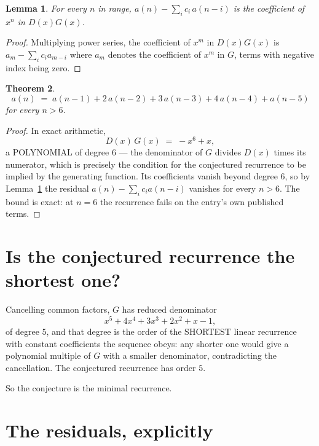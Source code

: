 \documentclass[11pt,a4paper]{article}
\theoremstyle{plain}
\newtheorem{theorem}{Theorem}
\newtheorem{lemma}[theorem]{Lemma}
\theoremstyle{definition}
\begin{document}
\begin{lemma}\label{lem:key}
For every $n$ in range, $a(n)-\sum_i c_i\,a(n-i)$ is the coefficient of $x^{n}$ in
$D(x)G(x)$.
\end{lemma}

\begin{proof}
Multiplying power series, the coefficient of $x^{m}$ in $D(x)G(x)$ is
$a_m-\sum_i c_i a_{m-i}$ where $a_m$ denotes the coefficient of $x^{m}$ in $G$, terms with
negative index being zero.
\end{proof}

\begin{theorem}
\[
a(n)\;=\;a(n-1) + 2\,a(n-2) + 3\,a(n-3) + 4\,a(n-4) + a(n-5)
\]
for every $n>6$.
\end{theorem}

\begin{proof}
In exact arithmetic,
\[
D(x)\,G(x)\;=\;- x^{6} + x,
\]
a POLYNOMIAL of degree $6$ --- the denominator of $G$ divides $D(x)$ times its numerator,
which is precisely the condition for the conjectured recurrence to be implied by the
generating function. Its coefficients vanish beyond degree $6$, so by
Lemma~\ref{lem:key} the residual $a(n)-\sum_ic_ia(n-i)$ vanishes for every
$n>6$. The bound is exact: at $n=6$ the recurrence fails on the entry's own published terms.
\end{proof}

\section{Is the conjectured recurrence the shortest one?}

Cancelling common factors, $G$ has reduced denominator
\[
x^{5} + 4 x^{4} + 3 x^{3} + 2 x^{2} + x - 1,
\]
of degree $5$, and that degree is the order of the SHORTEST linear recurrence with
constant coefficients the sequence obeys: any shorter one would give a polynomial multiple of
$G$ with a smaller denominator, contradicting the cancellation. The conjectured recurrence has
order $5$.

So the conjecture is the minimal recurrence.

\section{The residuals, explicitly}
\end{document}
